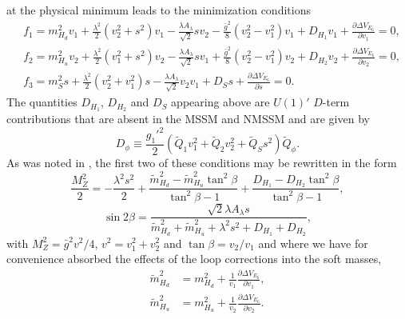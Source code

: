 \documentclass[preprint,amsmath,amssymb,aps,superscriptaddress,prd,showpacs,floatfix]{revtex4-1}
\begin{document}
at the physical minimum leads to the minimization conditions
\begin{subequations}\label{eq:E6EWSBConditions}
\begin{align}
&f_1=m_{H_d}^2v_1+\frac{\lambda^2}{2}(v_2^2+s^2)v_1-\frac{\lambda A_\lambda}{\sqrt{2}}sv_2-\frac{\bar{g}^2}{8}
(v_2^2-v_1^2)v_1+D_{H_1}v_1+\frac{\partial \Delta V_{E_6}}{\partial v_1}=0,\label{eq:E6EWSBcondition1} \\
&f_2=m_{H_u}^2v_2+\frac{\lambda^2}{2}(v_1^2+s^2)v_2-\frac{\lambda A_\lambda}{\sqrt{2}}sv_1+\frac{\bar{g}^2}{8}
(v_2^2-v_1^2)v_2+D_{H_2}v_2+\frac{\partial \Delta V_{E_6}}{\partial v_2}=0,\label{eq:E6EWSBcondition2} \\
&f_3=m_S^2s+\frac{\lambda^2}{2}(v_2^2+v_1^2)s-\frac{\lambda A_\lambda}{\sqrt{2}}v_2v_1+D_Ss+\frac{\partial \Delta V_{E_6}}{\partial s}=0.\label{eq:E6EWSBcondition3}
\end{align}
\end{subequations}
The quantities $D_{H_1}$, $D_{H_2}$ and $D_S$ appearing above are $U(1)'$ $D$-term contributions that are absent in the MSSM and NMSSM and are given by
\begin{equation}\label{eq:E6Dterms}
D_\phi\equiv \frac{g_1'^2}{2}\left ( \tilde{Q}_1v_1^2+\tilde{Q}_2v_2^2+\tilde{Q}_Ss^2\right )\tilde{Q}_\phi.
\end{equation}
As was noted in \cite{Athron:2013ipa}, the first two of these conditions may be rewritten in the form
\begin{equation}\label{eq:E6MZequation}
\frac{M_Z^2}{2}=-\frac{\lambda^2s^2}{2}+\frac{\tilde{m}_{H_d}^2-\tilde{m}_{H_u}^2\tan^2\beta}{\tan^2\beta-1}+\frac{D_{H_1}-D_{H_2}\tan^2\beta}{\tan^2\beta-1},
\end{equation}
\begin{equation}\label{eq:E6sin2bequation}
\sin 2\beta=\frac{\sqrt{2}\lambda A_{\lambda} s}{\tilde{m}_{H_d}^2+\tilde{m}_{H_u}^2+\lambda^2s^2+D_{H_1}+D_{H_2}},
\end{equation}
with $M_Z^2=\bar{g}^2v^2/4$, $v^2=v_1^2+v_2^2$ and $\tan\beta = v_2/v_1$ and where we have for convenience absorbed the effects of the loop corrections into the soft masses, 
\begin{align*}
\tilde{m}_{H_d}^2&=m_{H_d}^2+\frac{1}{v_1}\frac{\partial \Delta V_{E_6}}{\partial v_1},\\
\tilde{m}_{H_u}^2&=m_{H_u}^2+\frac{1}{v_2}\frac{\partial \Delta V_{E_6}}{\partial v_2}.
\end{align*}
\end{document}
